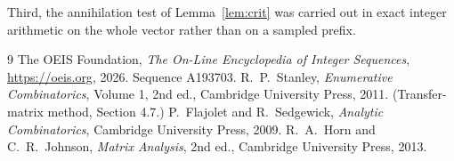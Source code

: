 \documentclass[11pt,a4paper]{article}
\theoremstyle{plain}
\theoremstyle{definition}
\begin{document}
Third, the annihilation test of Lemma~\ref{lem:crit} was carried out in exact integer
arithmetic on the whole vector rather than on a sampled prefix.

\begin{thebibliography}{9}
 The OEIS Foundation, \emph{The On-Line Encyclopedia of Integer
Sequences}, \url{https://oeis.org}, 2026. Sequence A193703.
 R.~P.~Stanley, \emph{Enumerative Combinatorics}, Volume 1, 2nd ed.,
Cambridge University Press, 2011. (Transfer-matrix method, Section 4.7.)
 P.~Flajolet and R.~Sedgewick, \emph{Analytic Combinatorics}, Cambridge
University Press, 2009.
 R.~A.~Horn and C.~R.~Johnson, \emph{Matrix Analysis}, 2nd ed., Cambridge
University Press, 2013.
\end{thebibliography}
\end{document}
